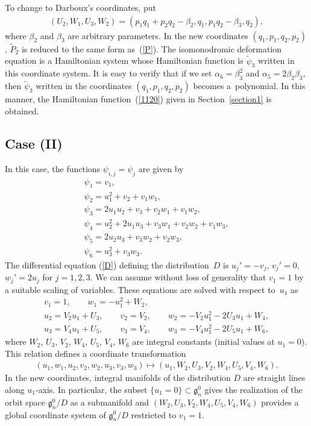 \documentclass[pdftex]{sigma}
\numberwithin{equation}{section}
\begin{document}
To change to Darboux's coordinates, put
\begin{gather*}
(U_2, W_1, U_3, W_2) = (p_1q_1 + p_2q_2 - \beta_2, q_1, p_1q_2-\beta_3, q_2),
\end{gather*}
where $\beta_2$ and $\beta_3$ are arbitrary parameters. In the new coordinates $(q_1, p_1,q_2,p_2)$, $\widetilde{P}_2$ is reduced to the same form as~(\ref{P}). The isomonodromic deformation equation is a Hamiltonian system whose Hamiltonian function is $\widetilde{\psi}_3$ written in this coordinate system. It is easy to verify that if we set $\alpha _6 = \beta_3^2$ and $\alpha _5 = 2\beta_2\beta_3$, then $\widetilde{\psi}_3$ written in the coordinates $(q_1, p_1,q_2,p_2)$ becomes a~polynomial. In this manner, the Hamiltonian function~(\ref{1120}) given in Section~\ref{section1} is obtained.

\subsection{Case (II)}\label{section4.2}

In this case, the functions $\psi _{i,j} = \psi _j$ are given by
\begin{gather*}
\psi _1 = v_1, \\
\psi _2 = u_1^2 + v_2 + v_1w_1, \\
\psi _3 = 2u_1u_2 + v_3 + v_2w_1 + v_1w_2, \\
\psi _4 = u_2^2 + 2u_1u_3 + v_3w_1 + v_2w_2 + v_1w_3, \\
\psi_5 = 2u_2u_3 + v_3w_2 + v_2w_3, \\
\psi_6 = u_3^2 + v_3w_3.
\end{gather*}
The dif\/ferential equation (\ref{D}) def\/ining the distribution~$D$ is $u_j' = -v_j$, $v_j' = 0$, $w_j' = 2u_j$ for $j=1,2,3$. We can assume without loss of generality that $v_1 = 1$ by a suitable scaling of variables. These equations are solved with respect to~$u_1$ as
\begin{gather*}
v_1 = 1,\qquad w_1 = -u_1^2 + W_2,\\
u_2 = V_2 u_1 + U_3,\qquad v_2 = V_2, \qquad w_2 = -V_2u_1^2-2U_3u_1+W_4, \\
u_3 = V_4 u_1 + U_5,\qquad v_3 = V_4,\qquad w_3 = -V_4u_1^2 - 2U_5u_1 + W_6,
\end{gather*}
where $W_2$, $U_3$, $V_2$, $W_4$, $U_5$, $V_4$, $W_6$ are integral constants (initial values at $u_1 = 0$). This relation def\/ines a coordinate transformation
\begin{gather*}
(u_1, w_1, u_2, v_2, w_2, u_3, v_3, w_3) \mapsto (u_1, W_2, U_3, V_2, W_4, U_5, V_4, W_6).
\end{gather*}
In the new coordinates, integral manifolds of the distribution $D$ are straight lines along $u_1$-axis. In particular, the subset $\{ u_1 = 0\} \subset \mathfrak{g}^0_n$ gives the realization of the orbit space $\mathfrak{g}^0_n/D$ as a submanifold and $( W_2, U_3, V_2, W_4, U_5, V_4, W_6)$ provides a global coordinate system of $\mathfrak{g}^0_n/D$ restricted to $v_1 = 1$.
\end{document}
